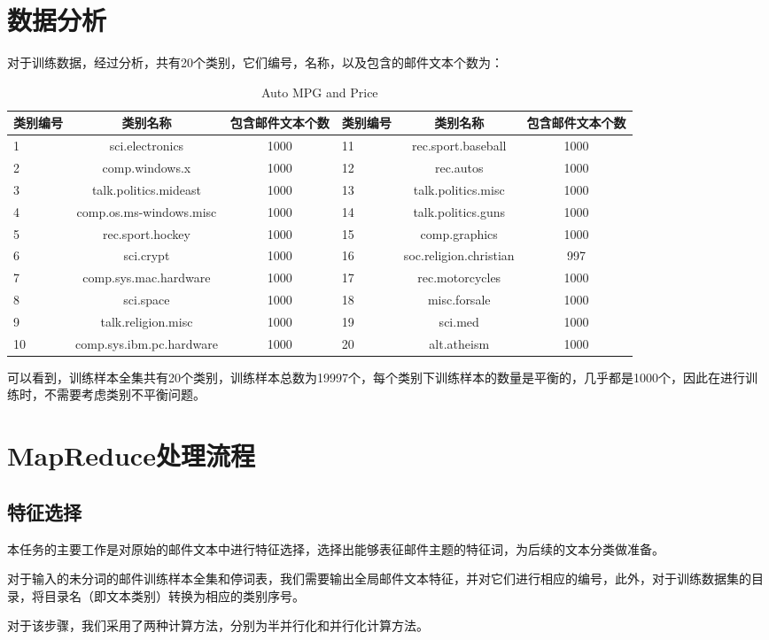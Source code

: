 \documentclass[lang=cn,11pt]{elegantpaper}
\begin{document}
\begin{lstlisting}

\end{lstlisting}

\section{数据分析}
对于训练数据，经过分析，共有20个类别，它们编号，名称，以及包含的邮件文本个数为：\par
\begin{table}[htbp]
  \small
  \centering
  \caption{Auto MPG and Price \label{tab:reg}}
    \begin{tabular}{lcc|lcc}
    \toprule
    类别编号  &   类别名称  &   包含邮件文本个数  &   类别编号  & 类别名称  & 包含邮件文本个数  \\
    \hline
    1 & sci.electronics & 1000            & 11 & rec.sport.baseball & 1000 \\
    2 & comp.windows.x & 1000             & 12 & rec.autos & 1000 \\
    3 & talk.politics.mideast & 1000      & 13 & talk.politics.misc & 1000 \\
    4 & comp.os.ms-windows.misc & 1000    & 14 & talk.politics.guns & 1000 \\
    5 & rec.sport.hockey & 1000           & 15 & comp.graphics & 1000 \\
    6 & sci.crypt & 1000                  & 16 & soc.religion.christian & 997 \\
    7 & comp.sys.mac.hardware & 1000      & 17 & rec.motorcycles & 1000 \\
    8 & sci.space & 1000                  & 18 & misc.forsale & 1000 \\
    9 & talk.religion.misc & 1000         & 19 & sci.med & 1000 \\
    10 & comp.sys.ibm.pc.hardware & 1000  & 20 & alt.atheism & 1000 \\
    \bottomrule
    \end{tabular}%
\end{table}%
可以看到，训练样本全集共有20个类别，训练样本总数为19997个，每个类别下训练样本的数量是平衡的，几乎都是1000个，因此在进行训练时，不需要考虑类别不平衡问题。


\section{MapReduce处理流程}
\subsection{特征选择}
本任务的主要工作是对原始的邮件文本中进行特征选择，选择出能够表征邮件主题的特征词，为后续的文本分类做准备。\par
对于输入的未分词的邮件训练样本全集和停词表，我们需要输出全局邮件文本特征，并对它们进行相应的编号，此外，对于训练数据集的目录，将目录名（即文本类别）转换为相应的类别序号。\par
对于该步骤，我们采用了两种计算方法，分别为半并行化和并行化计算方法。
\end{document}
